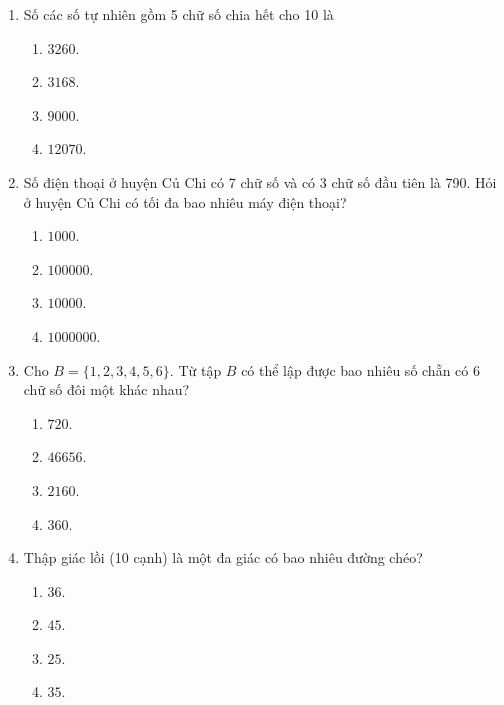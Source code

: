 \begin{enumerate}[label=\textbf{Câu \arabic*.},align=left,left=0cm..0cm,itemindent=*]
\begin{multicols}{4}
\begin{enumerate}[label=\textbf{\Alph*.},align=left,left=1cm..0cm,itemindent=*]
	\end{enumerate}\end{multicols}
	\item Số các số tự nhiên gồm 5 chữ số chia hết cho 10 là
	\begin{multicols}{4}\begin{enumerate}[label=\textbf{\Alph*.},align=left,left=1cm..0cm,itemindent=*]
		\item $3260$. \item $3168$. \item $9000$. \item $12070$.
	\end{enumerate}\end{multicols}
	\item Số điện thoại ở huyện Củ Chi có 7 chữ số và có 3 chữ số đầu tiên là 790. Hỏi ở huyện Củ Chi có tối đa bao nhiêu máy điện thoại?
	\begin{multicols}{4}\begin{enumerate}[label=\textbf{\Alph*.},align=left,left=1cm..0cm,itemindent=*]
		\item $1000$. \item $100000$. \item $10000$. \item $1000000$.
	\end{enumerate}\end{multicols}
	\item Cho $B=\{1,2,3,4,5,6\}$. Từ tập $B$ có thể lập được bao nhiêu số chẵn có 6 chữ số đôi một khác nhau?
	\begin{multicols}{4}\begin{enumerate}[label=\textbf{\Alph*.},align=left,left=1cm..0cm,itemindent=*]
		\item $720$. \item $46656$. \item $2160$. \item $360$.
	\end{enumerate}\end{multicols}
	\item Thập giác lồi (10 cạnh) là một đa giác có bao nhiêu đường chéo?
	\begin{multicols}{4}\begin{enumerate}[label=\textbf{\Alph*.},align=left,left=1cm..0cm,itemindent=*]
		\item $36$. \item $45$. \item $25$. \item $35$.
	\end{enumerate}\end{multicols}

\end{enumerate}
